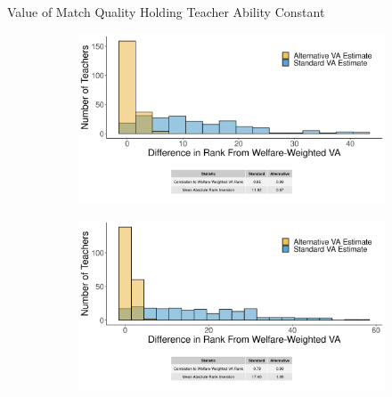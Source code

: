 \documentclass[11pt]{beamer}
\begin{document}
\begin{frame}{Value of Match Quality Holding Teacher Ability Constant}
{\begin{figure}
        \begin{subfigure}{.5\textwidth}
          \centering
          \includegraphics[width=\linewidth]{slides/Figures/np_hist_run_7.png}
        \end{subfigure}%
        \begin{subfigure}{.5\textwidth}
          \centering
          \includegraphics[width=\linewidth]{slides/Figures/np_hist_run_8.png}
        \end{subfigure}
    \end{figure}
    
    }
    

\end{frame}
\end{document}
